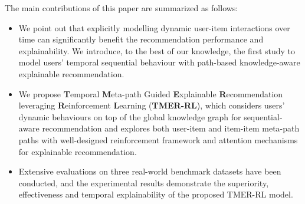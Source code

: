 The main contributions of this paper are summarized as follows:
\begin{itemize}
	\item We point out that explicitly modelling dynamic user-item interactions over time can significantly benefit the recommendation performance and explainability. We introduce, to the best of our knowledge, the first study to model users' temporal sequential behaviour with path-based knowledge-aware explainable recommendation.
	
	\item We propose \textbf{T}emporal \textbf{M}eta-path Guided \textbf{E}xplainable \textbf{R}ecommendation leveraging \textbf{R}einforcement \textbf{L}earning (\textbf{TMER-RL}), which considers users' dynamic behaviours on top of the global knowledge graph for sequential-aware recommendation and explores both user-item and item-item meta-path paths with well-designed reinforcement framework and attention mechanisms for explainable recommendation.
	
	
	\item Extensive evaluations on three real-world benchmark datasets have been conducted, and the experimental results demonstrate the superiority, effectiveness and temporal explainability of the proposed TMER-RL model. 
	
\end{itemize}